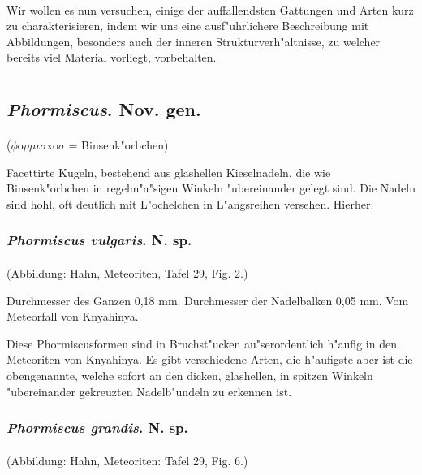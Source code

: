 \documentclass[a4paper, 11pt, oneside]{article}
\begin{document}
\paragraph{}
Wir wollen es nun versuchen, einige der auffallendsten Gattungen und Arten kurz zu charakterisieren, indem wir uns eine ausf"uhrlichere Beschreibung mit Abbildungen, besonders auch der inneren Strukturverh"altnisse, zu welcher bereits viel Material vorliegt, vorbehalten.
\clearpage
\section{}
\subsection{\emph{Phormiscus}. Nov. gen.}
\paragraph{}
($\phi$o$\rho\mu\iota\sigma$xo$\sigma$ = Binsenk"orbchen)%

Facettirte Kugeln, bestehend aus glashellen Kieselnadeln, die wie Binsenk"orbchen in regelm"a"sigen Winkeln "ubereinander gelegt sind. Die Nadeln sind hohl, oft deutlich mit L"ochelchen in L"angsreihen versehen. Hierher:
\subsubsection{\emph{Phormiscus vulgaris}. N. sp.}
\paragraph{}
(Abbildung: Hahn, Meteoriten, Tafel 29, Fig. 2.)

Durchmesser des Ganzen 0,18 mm. Durchmesser der Nadelbalken 0,05 mm. Vom Meteorfall von Knyahinya.

Diese Phormiscusformen sind in Bruchst"ucken au"serordentlich h"aufig in den Meteoriten von Knyahinya. Es gibt verschiedene Arten, die h"aufigste aber ist die obengenannte, welche sofort an den dicken, glashellen, in spitzen Winkeln "ubereinander gekreuzten Nadelb"undeln zu erkennen ist.
\subsubsection{\emph{Phormiscus grandis}. N. sp.}
\paragraph{}
(Abbildung: Hahn, Meteoriten: Tafel 29, Fig. 6.)
\end{document}
